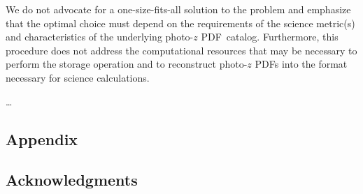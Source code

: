 \documentclass[\docopts]{\docclass}
\newcommand{\pz}{photo-$z$ PDF}
\begin{document}
We do not advocate for a one-size-fits-all solution to the problem and 
emphasize that the optimal choice must depend on the requirements of the 
science metric(s) and characteristics of the underlying \pz\ catalog.  
Furthermore, this procedure does not address the computational resources that 
may be necessary to perform the storage operation and to reconstruct \pz s into 
the format necessary for science calculations.

\dots


\subsection*{Appendix}
\label{sec:kld}


\subsection*{Acknowledgments}









\end{document}
